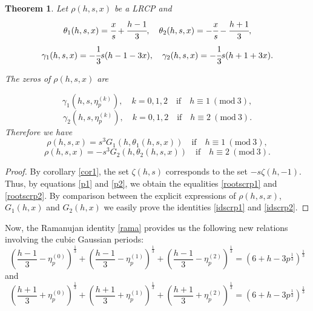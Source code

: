 \documentclass[12pt,reqno]{article}
\newtheorem{theorem}{Theorem}
\begin{document}
\begin{theorem}
Let $\rho(h,s,x)$ be a LRCP and 
$$\theta_1(h,s,x)=\cfrac{x}{s}+\cfrac{h-1}{3},\quad \theta_2(h,s,x)=-\cfrac{x}{s}-\cfrac{h+1}{3},$$
$$ \gamma_1(h,s,x)=-\cfrac{1}{3}s(h-1-3x),\quad \gamma_2(h,s,x)=-\cfrac{1}{3}s(h+1+3x). $$

The zeros of $\rho(h,s,x)$ are

\begin{equation}\label{rootscrp1}
\gamma_1(h,s,\eta_p^{(k)}),\quad k=0,1,2 \quad \text{if} \quad h\equiv 1 \ (\text{mod} \ 3),\end{equation}
\begin{equation}\label{rootscrp2}
\gamma_2(h,s,\eta_p^{(k)}),\quad k=0,1,2 \quad \text{if} \quad h\equiv 2 \ (\text{mod}\ 3).\end{equation}
Therefore we have
\begin{equation}\label{idscrp1}
\rho(h,s,x)=s^3G_1(h,\theta_1(h,s,x))\quad\text{if} \quad h\equiv 1 \ (\text{mod}\ 3),\end{equation}
\begin{equation}\label{idscrp2}
\rho(h,s,x)=-s^3G_2(h,\theta_2(h,s,x))\quad\text{if} \quad h\equiv 2 \ (\text{mod}\ 3).\end{equation}
\end{theorem}
\begin{proof}
By corollary \ref{cor1}, the set $\zeta(h,s)$ corresponds to the set $-s\zeta(h,-1)$. Thus, by equations \eqref{p1} and \eqref{p2}, we obtain the equalities \eqref{rootscrp1} and \eqref{rootscrp2}. 
By comparison between the explicit expressions of $\rho(h,s,x)$, $G_1(h,x)$ and $G_2(h,x)$ we easily prove the identities \eqref{idscrp1} and \eqref{idscrp2}.
\end{proof}
Now, the Ramanujan identity \eqref{rama} provides us the following new relations involving the cubic Gaussian periods:
\small
\begin{equation} \label{gaussrama}
\left(\frac{h-1}{3}-\eta_p^{(0)}\right)^{\frac{1}{3}}+\left(\frac{h-1}{3}-\eta_p^{(1)}\right)^{\frac{1}{3}}+\left(\frac{h-1}{3}-\eta_p^{(2)}\right)^{\frac{1}{3}}=\left(6+h-3p^{\frac{1}{3}}\right)^{\frac{1}{3}}
\end{equation}
\normalsize
and
\small
\begin{equation} \label{gaussrama2}
\left(\frac{h+1}{3}+\eta_p^{(0)}\right)^{\frac{1}{3}}+\left(\frac{h+1}{3}+\eta_p^{(1)}\right)^{\frac{1}{3}}+\left(\frac{h+1}{3}+\eta_p^{(2)}\right)^{\frac{1}{3}}=\left(6+h-3p^{\frac{1}{3}}\right)^{\frac{1}{3}}
\end{equation}
\end{document}
